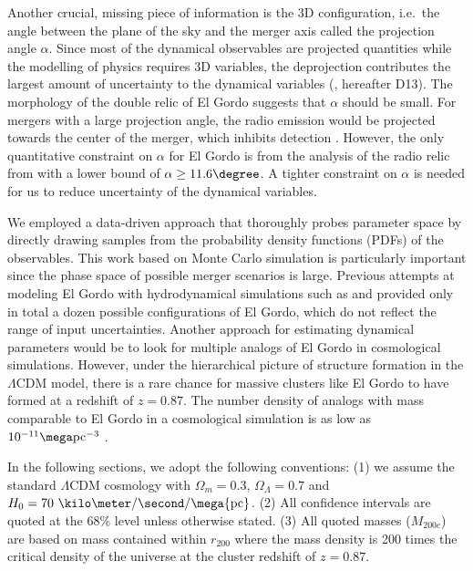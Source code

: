 \documentclass[letterpaper,useAMS,usenatbib]{mn2e}
\begin{document}
Another crucial, missing piece of information is the 3D
configuration, i.e.\ the angle between the plane of the sky and the merger
axis called the projection angle $\alpha$. Since most of the dynamical
observables are projected quantities while the modelling of physics
requires 3D
variables, the deprojection contributes the
largest amount of uncertainty to the dynamical variables
(\citealt{D13}, hereafter D13). The morphology of the double relic of El Gordo suggests that
$\alpha$ should be small. 
For mergers with a
large projection angle, the radio emission would be projected towards the
center of the merger, which inhibits detection \citep{Vazza11}.
However, the only quantitative constraint on $\alpha$ for El Gordo is from
the analysis of the radio relic from \cite{L13} with a lower bound of $\alpha \geq 11.6 \degree$. A tighter
constraint on $\alpha$ is needed for us to reduce uncertainty of the
dynamical variables. 
\par 
We employed a data-driven approach that thoroughly probes parameter
space by directly drawing samples from the probability density functions
(PDFs) of
the observables. 
This work based on Monte Carlo simulation is particularly important since
the phase space of possible merger scenarios is large. Previous attempts at modeling El Gordo with hydrodynamical
simulations such as \cite{Donnert13} and \cite{Molnar14} provided only in
total a dozen possible configurations of El Gordo, which do not
reflect the range of input uncertainties. Another approach for
estimating dynamical parameters would be to look for multiple analogs of El Gordo in cosmological
simulations.  However, under the hierarchical picture
of structure formation in the $\Lambda$CDM model, there is a rare chance
for massive clusters like El Gordo to have formed at a redshift of $z = 0.87$.  
The number density of analogs with mass comparable to El Gordo in a
cosmological simulation is as low as $10^{-11} \mega\text{pc}^{-3}$ .  
\par
In the following sections, we adopt the following conventions: (1) we
assume the standard $\Lambda$CDM cosmology with $\Omega_{m} = 0.3$,
$\Omega_{\Lambda} = 0.7$ and $H_0 = 70~\kilo\meter / \second / \mega
{\rm pc}$. (2) All confidence intervals are quoted at the 68\% level unless otherwise stated. 
(3) All quoted masses ($M_{200c}$) are based on mass contained
within $r_{200}$ where the mass density is 200 times the critical density
of the universe at the cluster redshift of $z = 0.87$. 
\end{document}
